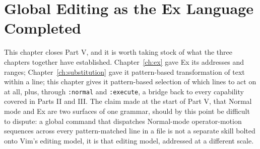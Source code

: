 \section{Global Editing as the Ex Language Completed}

This chapter closes Part V, and it is worth taking stock of what the three chapters together have established. Chapter~\ref{ch:ex} gave Ex its addresses and ranges; Chapter~\ref{ch:substitution} gave it pattern-based transformation of text within a line; this chapter gives it pattern-based selection of which lines to act on at all, plus, through \texttt{:normal} and \texttt{:execute}, a bridge back to every capability covered in Parts II and III. The claim made at the start of Part V, that Normal mode and Ex are two surfaces of one grammar, should by this point be difficult to dispute: a global command that dispatches Normal-mode operator-motion sequences across every pattern-matched line in a file is not a separate skill bolted onto Vim's editing model, it is that editing model, addressed at a different scale.

